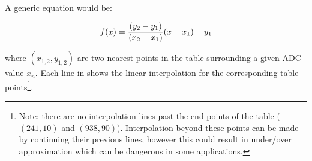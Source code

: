 \documentclass[main.tex]{subfiles}
\begin{document}
		A generic equation would be:

		\[
			f(x) = \frac{(y_{2}-y_{1})}{(x_{2}-x_{1})}(x-x_{1})+y_{1}\\
		\]

		where $(x_{1,2},y_{1,2})$ are two nearest points in the table surrounding a
		given ADC value $x_{n}$. Each line in  shows the linear
		interpolation for the corresponding table points\footnote{Note: there are no
			interpolation lines past the end points of the table ($(241,10)$ and
			$(938,90)$). Interpolation beyond these points can be made by continuing
			their previous lines, however this could result in under/over
			approximation which can be dangerous in some  applications.}.
\end{document}

